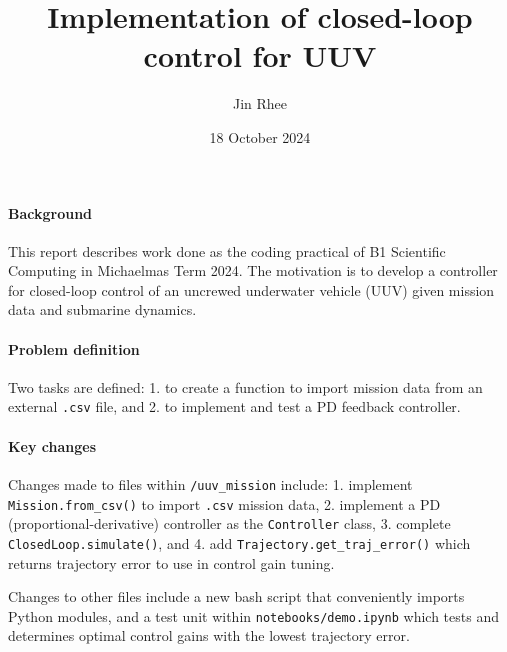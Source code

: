 \documentclass[10pt]{article}
\title{Implementation of closed-loop control for UUV}
\author{Jin Rhee}
\date{18 October 2024}
\begin{document}
\maketitle
\paragraph{Background} This report describes work done as the coding practical of B1 Scientific Computing in Michaelmas Term 2024.
The motivation is to develop a controller for closed-loop control of an uncrewed underwater vehicle (UUV) given mission data and submarine dynamics.

\paragraph{Problem definition} Two tasks are defined:
1. to create a function to import mission data from an external \texttt{.csv} file, and
2. to implement and test a PD feedback controller.

\paragraph{Key changes}
Changes made to files within \texttt{/uuv\_mission} include:
1. implement \texttt{Mission.from\_csv()} to import \texttt{.csv} mission data,
2. implement a PD (proportional-derivative) controller as the \texttt{Controller} class,
3. complete \texttt{ClosedLoop.simulate()}, and
4. add \texttt{Trajectory.get\_traj\_error()} which returns trajectory error to use in control gain tuning.
\par
Changes to other files include a new bash script that conveniently imports Python modules, and a
test unit within \texttt{notebooks/demo.ipynb} which tests and determines optimal control gains with the
lowest trajectory error.


\end{document}

